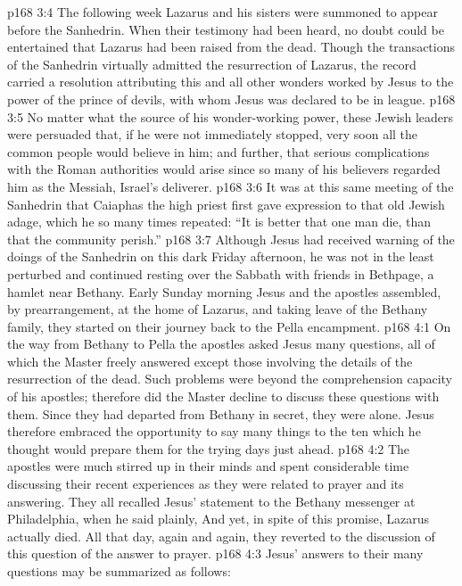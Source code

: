 \vs p168 3:4 The following week Lazarus and his sisters were summoned to appear before the Sanhedrin. When their testimony had been heard, no doubt could be entertained that Lazarus had been raised from the dead. Though the transactions of the Sanhedrin virtually admitted the resurrection of Lazarus, the record carried a resolution attributing this and all other wonders worked by Jesus to the power of the prince of devils, with whom Jesus was declared to be in league.
\vs p168 3:5 No matter what the source of his wonder\hyp{}working power, these Jewish leaders were persuaded that, if he were not immediately stopped, very soon all the common people would believe in him; and further, that serious complications with the Roman authorities would arise since so many of his believers regarded him as the Messiah, Israel’s deliverer.
\vs p168 3:6 It was at this same meeting of the Sanhedrin that Caiaphas the high priest first gave expression to that old Jewish adage, which he so many times repeated: “It is better that one man die, than that the community perish.”
\vs p168 3:7 Although Jesus had received warning of the doings of the Sanhedrin on this dark Friday afternoon, he was not in the least perturbed and continued resting over the Sabbath with friends in Bethpage, a hamlet near Bethany. Early Sunday morning Jesus and the apostles assembled, by prearrangement, at the home of Lazarus, and taking leave of the Bethany family, they started on their journey back to the Pella encampment.
\vs p168 4:1 On the way from Bethany to Pella the apostles asked Jesus many questions, all of which the Master freely answered except those involving the details of the resurrection of the dead. Such problems were beyond the comprehension capacity of his apostles; therefore did the Master decline to discuss these questions with them. Since they had departed from Bethany in secret, they were alone. Jesus therefore embraced the opportunity to say many things to the ten which he thought would prepare them for the trying days just ahead.
\vs p168 4:2 The apostles were much stirred up in their minds and spent considerable time discussing their recent experiences as they were related to prayer and its answering. They all recalled Jesus’ statement to the Bethany messenger at Philadelphia, when he said plainly,  And yet, in spite of this promise, Lazarus actually died. All that day, again and again, they reverted to the discussion of this question of the answer to prayer.
\vs p168 4:3 Jesus’ answers to their many questions may be summarized as follows:
